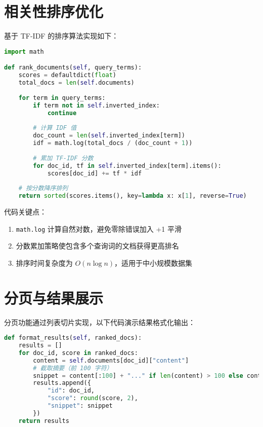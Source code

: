 \section{相关性排序优化}
基于 TF-IDF 的排序算法实现如下：\par
\begin{lstlisting}[language=python]
import math

def rank_documents(self, query_terms):
    scores = defaultdict(float)
    total_docs = len(self.documents)
    
    for term in query_terms:
        if term not in self.inverted_index:
            continue
        
        # 计算 IDF 值
        doc_count = len(self.inverted_index[term])
        idf = math.log(total_docs / (doc_count + 1))
        
        # 累加 TF-IDF 分数
        for doc_id, tf in self.inverted_index[term].items():
            scores[doc_id] += tf * idf
    
    # 按分数降序排列
    return sorted(scores.items(), key=lambda x: x[1], reverse=True)
\end{lstlisting}
代码关键点：\par
\begin{enumerate}
\item \verb!math.log! 计算自然对数，避免零除错误加入 +1 平滑
\item 分数累加策略使包含多个查询词的文档获得更高排名
\item 排序时间复杂度为 $O(n \log n)$，适用于中小规模数据集
\end{enumerate}
\section{分页与结果展示}
分页功能通过列表切片实现，以下代码演示结果格式化输出：\par
\begin{lstlisting}[language=python]
def format_results(self, ranked_docs):
    results = []
    for doc_id, score in ranked_docs:
        content = self.documents[doc_id]["content"]
        # 截取摘要（前 100 字符）
        snippet = content[:100] + "..." if len(content) > 100 else content
        results.append({
            "id": doc_id,
            "score": round(score, 2),
            "snippet": snippet
        })
    return results
\end{lstlisting}
